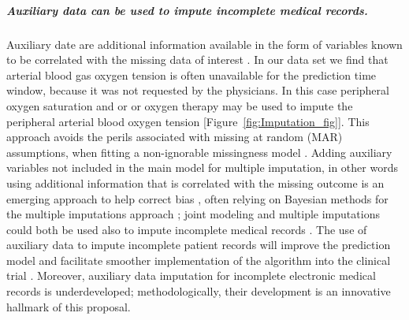 \documentclass[11pt,notitlepage]{article}
\begin{document}
\subparagraph*{Auxiliary data can be used to impute incomplete medical records.}
Auxiliary date are additional information available in the form of variables known to be correlated with the missing data of interest \cite{Daniels24571539}. In our data set we find that arterial blood gas oxygen tension is often unavailable for the prediction time window, because it was not requested by the physicians. In this case peripheral oxygen saturation and or or oxygen therapy may be used to impute the peripheral arterial blood oxygen tension [Figure~\ref{fig:Imputation_fig}]. This approach avoids the perils associated with missing at random (MAR) assumptions, when fitting a non-ignorable missingness model \cite{Wang_20029935}. Adding auxiliary variables not included in the main model for multiple imputation, in other words using additional information that is correlated with the missing outcome is an emerging approach to help correct bias \cite{Meng_1994, Collins_11778676, Rubin_1996}, often relying on Bayesian methods for the multiple imputations approach \cite{Daniels_2008, Schafer_1997}; joint modeling and multiple imputations could both be used also to impute incomplete medical records \cite{Fitzmaurice_2008}. The use of auxiliary data to impute incomplete patient records will improve the prediction model and facilitate smoother implementation of the algorithm into the clinical trial \cite{Hall_25389642}. Moreover, auxiliary data imputation for incomplete electronic medical records is underdeveloped; methodologically, their development is an innovative hallmark of this proposal.
\end{document}
